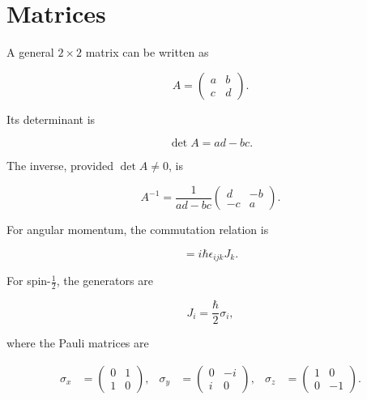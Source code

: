 \documentclass[12pt,a4paper]{article}
\begin{document}
	\section{Matrices}
	
	A general $2\times2$ matrix can be written as
	
	\begin{equation}
		A =
		\begin{pmatrix}
			a & b \\
			c & d
		\end{pmatrix}.
	\end{equation}
	
	Its determinant is
	
	\begin{equation}
		\det A = ad-bc.
	\end{equation}
	
	The inverse, provided $\det A\neq0$, is
	
	\begin{equation}
		A^{-1}
		=
		\frac{1}{ad-bc}
		\begin{pmatrix}
			d & -b \\
			-c & a
		\end{pmatrix}.
	\end{equation}
	
	For angular momentum, the commutation relation is
	
	\begin{equation}
		[J_i,J_j]
		=
		i\hbar\epsilon_{ijk}J_k.
	\end{equation}
	
	For spin-$\frac12$, the generators are
	
	\begin{equation}
		J_i = \frac{\hbar}{2}\sigma_i,
	\end{equation}
	
	where the Pauli matrices are
	
	\begin{align}
		\sigma_x &=
		\begin{pmatrix}
			0 & 1 \\
			1 & 0
		\end{pmatrix},
		&
		\sigma_y &=
		\begin{pmatrix}
			0 & -i \\
			i & 0
		\end{pmatrix},
		&
		\sigma_z &=
		\begin{pmatrix}
			1 & 0 \\
			0 & -1
		\end{pmatrix}.
	\end{align}
	
\end{document}
